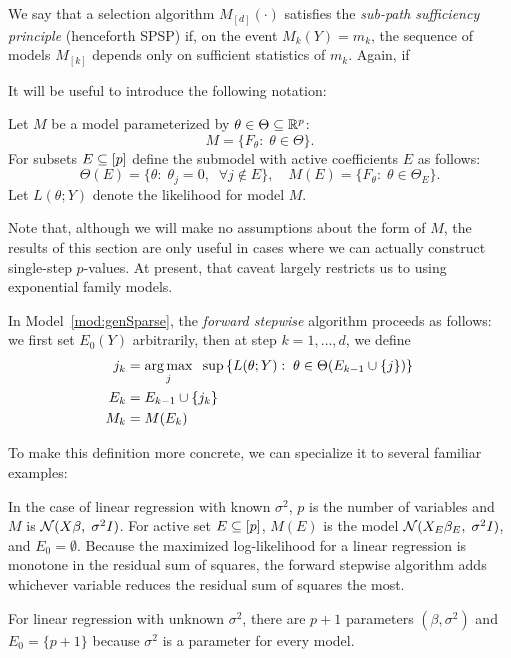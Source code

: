 \documentclass{article}
\begin{document}
We say that a selection algorithm $M_{[d]}(\cdot)$ satisfies the {\em sub-path sufficiency principle} (henceforth SPSP) if, on the event $M_k(Y)=m_k$, the sequence of models $M_{[k]}$ depends only on sufficient statistics of $m_k$. Again, if 

It will be useful to introduce the following notation:

\begin{model}\label{mod:genSparse}
  Let $M$ be a model parameterized by $\theta\in \Theta \subseteq \mathbb{R}^p$:
  \[
  M = \{F_\theta:\; \theta \in \Theta\}.
  \]
  For subsets $E\subseteq [p]$ define the submodel with active coefficients $E$ as follows:
  \[
  \Theta(E) = \{\theta:\; \theta_j = 0, \;\;\forall j \notin E\}, 
  \quad M(E) = \{F_\theta:\; \theta\in \Theta_E\}.
  \]
  Let $L(\theta; Y)$ denote the likelihood for model $M$.
\end{model}
Note that, although we will make no assumptions about the form of $M$, the results of this section are only useful in cases where we can actually construct single-step $p$-values. At present, that caveat largely restricts us to using exponential family models.

In Model~\ref{mod:genSparse}, the {\em forward stepwise} algorithm proceeds as follows: we first set $E_0(Y)$ arbitrarily, then at step $k=1,\ldots,d$, we define
\begin{align}\label{eq:forwardDef_start}
j_k &= \operatorname*{arg\,max}_j \;\;\sup \left\{L(\theta; Y):\; \theta\in\Theta(E_{k-1} \cup \{j\})\right\} \\
E_k &= E_{k-1} \cup \{j_k\}\\\label{eq:forwardDef_end}
M_k &= M(E_k)
\end{align}

To make this definition more concrete, we can specialize it to several familiar examples:

\begin{example}
In the case of linear regression with known $\sigma^2$, $p$ is the number of variables and $M$ is $\mathcal{N}(X\beta, \;\sigma^2I)$. For active set $E \subseteq [p]$, $M(E)$ is the model $\mathcal{N}(X_E\beta_E, \;\sigma^2I)$, and $E_0 = \emptyset$. Because the maximized log-likelihood for a linear regression is monotone in the residual sum of squares, the forward stepwise algorithm adds whichever variable reduces the residual sum of squares the most.

For linear regression with unknown $\sigma^2$, there are $p+1$ parameters $(\beta, \sigma^2)$ and $E_0 = \{p+1\}$ because $\sigma^2$ is a parameter for every model.
\end{example}
\end{document}
